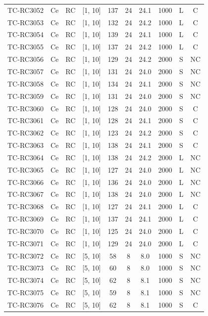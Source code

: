 \begin{longtable}{lccccccccc}
TC-RC3052 & Ce & RC & [1, 10] & 137 & 24 & 24.1 & 1000 & L & C \\
TC-RC3053 & Ce & RC & [1, 10] & 132 & 24 & 24.2 & 1000 & L & C \\
TC-RC3054 & Ce & RC & [1, 10] & 139 & 24 & 24.1 & 1000 & L & C \\
TC-RC3055 & Ce & RC & [1, 10] & 137 & 24 & 24.2 & 1000 & L & C \\
TC-RC3056 & Ce & RC & [1, 10] & 129 & 24 & 24.2 & 2000 & S & NC \\
TC-RC3057 & Ce & RC & [1, 10] & 131 & 24 & 24.0 & 2000 & S & NC \\
TC-RC3058 & Ce & RC & [1, 10] & 134 & 24 & 24.1 & 2000 & S & NC \\
TC-RC3059 & Ce & RC & [1, 10] & 131 & 24 & 24.0 & 2000 & S & NC \\
TC-RC3060 & Ce & RC & [1, 10] & 128 & 24 & 24.0 & 2000 & S & C \\
TC-RC3061 & Ce & RC & [1, 10] & 128 & 24 & 24.1 & 2000 & S & C \\
TC-RC3062 & Ce & RC & [1, 10] & 123 & 24 & 24.2 & 2000 & S & C \\
TC-RC3063 & Ce & RC & [1, 10] & 138 & 24 & 24.1 & 2000 & S & C \\
TC-RC3064 & Ce & RC & [1, 10] & 138 & 24 & 24.2 & 2000 & L & NC \\
TC-RC3065 & Ce & RC & [1, 10] & 127 & 24 & 24.0 & 2000 & L & NC \\
TC-RC3066 & Ce & RC & [1, 10] & 136 & 24 & 24.0 & 2000 & L & NC \\
TC-RC3067 & Ce & RC & [1, 10] & 138 & 24 & 24.0 & 2000 & L & NC \\
TC-RC3068 & Ce & RC & [1, 10] & 127 & 24 & 24.1 & 2000 & L & C \\
TC-RC3069 & Ce & RC & [1, 10] & 137 & 24 & 24.1 & 2000 & L & C \\
TC-RC3070 & Ce & RC & [1, 10] & 125 & 24 & 24.0 & 2000 & L & C \\
TC-RC3071 & Ce & RC & [1, 10] & 129 & 24 & 24.0 & 2000 & L & C \\
TC-RC3072 & Ce & RC & [5, 10] & 58 & 8 & 8.0 & 1000 & S & NC \\
TC-RC3073 & Ce & RC & [5, 10] & 60 & 8 & 8.0 & 1000 & S & NC \\
TC-RC3074 & Ce & RC & [5, 10] & 62 & 8 & 8.1 & 1000 & S & NC \\
TC-RC3075 & Ce & RC & [5, 10] & 59 & 8 & 8.1 & 1000 & S & NC \\
TC-RC3076 & Ce & RC & [5, 10] & 62 & 8 & 8.1 & 1000 & S & C \\

\end{longtable}
